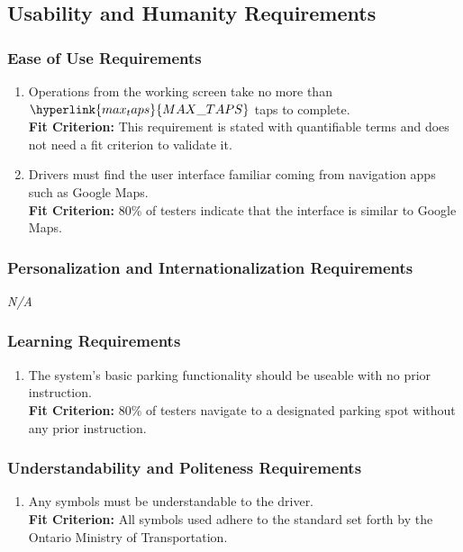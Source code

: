 \documentclass[12pt,letterpaper]{article}
\begin{document}
\subsection{Usability and Humanity Requirements}
\subsubsection{Ease of Use Requirements}
\begin{enumerate}[{UH}1.] 
    \item Operations from the working screen take no more than
    $\hyperlink{max_taps}{MAX\_TAPS}$ taps to complete.\\
    \textbf{Fit Criterion:} This requirement is stated with quantifiable terms
    and does not need a fit criterion to validate it. 
    \item Drivers must find the user interface familiar coming from navigation
    apps such as Google Maps.\\
    \textbf{Fit Criterion:} 80\% of testers indicate that the interface is
    similar to Google Maps.
\end{enumerate}

\subsubsection{Personalization and Internationalization Requirements}
\noindent \emph{N/A}

\subsubsection{Learning Requirements}
\begin{enumerate}[resume*] 
    \item The system's basic parking functionality should be useable with no
    prior instruction. \label{pocnf2}\\
    \textbf{Fit Criterion:} 80\% of testers navigate to a designated parking
    spot without any prior instruction. 
\end{enumerate}

\subsubsection{Understandability and Politeness Requirements}
\begin{enumerate}[resume*] 
    \item Any symbols must be understandable to the driver. \label{pocnf3} \\
    \textbf{Fit Criterion:} All symbols used adhere to the standard set forth by
    the Ontario Ministry of Transportation.
\end{enumerate}
\end{document}
